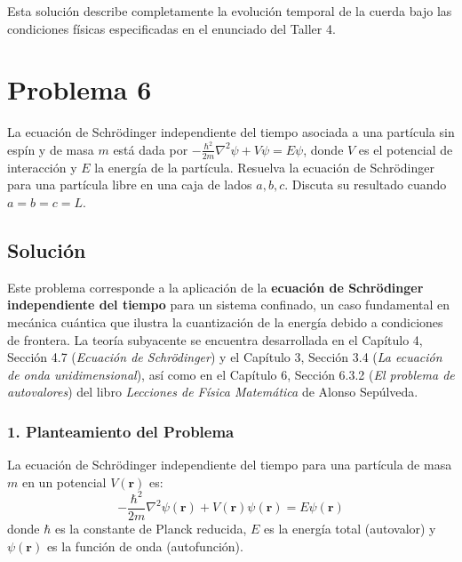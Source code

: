 \documentclass[a4paper]{article}
\begin{document}
Esta solución describe completamente la evolución temporal de la cuerda bajo las condiciones físicas especificadas en el enunciado del Taller 4.


\section{Problema 6}
La ecuación de Schrödinger independiente del tiempo asociada a una partícula sin espín y de masa $m$ está dada por $-\frac{\hbar^2}{2m} \nabla^2\psi + V \psi = E\psi$, donde $V$ es el potencial de interacción y $E$ la energía de la partícula. Resuelva la ecuación de Schrödinger para una partícula libre en una caja de lados $a, b, c$. Discuta su resultado cuando $a = b = c = L$.

\subsection{Solución}

Este problema corresponde a la aplicación de la \textbf{ecuación de Schrödinger independiente del tiempo} para un sistema confinado, un caso fundamental en mecánica cuántica que ilustra la cuantización de la energía debido a condiciones de frontera. La teoría subyacente se encuentra desarrollada en el Capítulo 4, Sección 4.7 (\textit{Ecuación de Schrödinger}) y el Capítulo 3, Sección 3.4 (\textit{La ecuación de onda unidimensional}), así como en el Capítulo 6, Sección 6.3.2 (\textit{El problema de autovalores}) del libro \textit{Lecciones de Física Matemática} de Alonso Sepúlveda.

\subsubsection{1. Planteamiento del Problema}

La ecuación de Schrödinger independiente del tiempo para una partícula de masa $m$ en un potencial $V(\mathbf{r})$ es:
\begin{equation}
-\frac{\hbar^2}{2m} \nabla^2\psi(\mathbf{r}) + V(\mathbf{r}) \psi(\mathbf{r}) = E\psi(\mathbf{r})
\label{eq:schrodinger}
\end{equation}
donde $\hbar$ es la constante de Planck reducida, $E$ es la energía total (autovalor) y $\psi(\mathbf{r})$ es la función de onda (autofunción).
\end{document}
